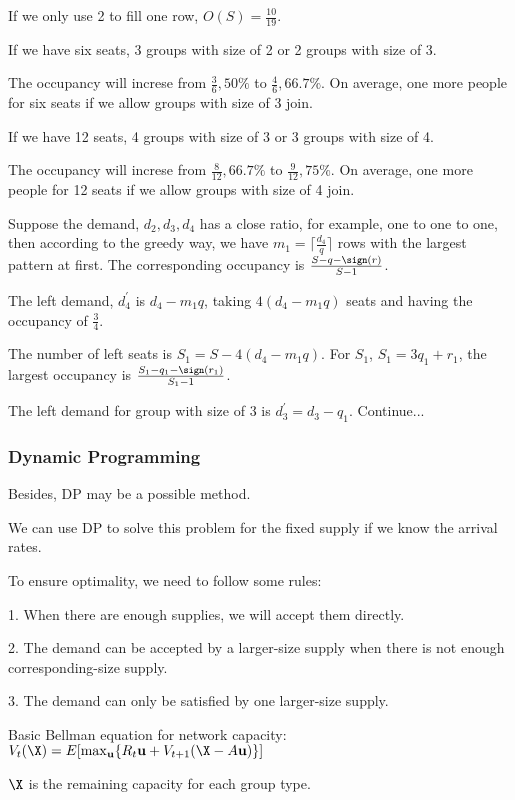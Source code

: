 If we only use 2 to fill one row, $O(S) = \frac{10}{19}$.

If we have six seats, 3 groups with size of 2 or 2 groups with size of 3.

The occupancy will increse from $\frac{3}{6}, 50\%$ to $\frac{4}{6}, 66.7\%$. On average, one more people for six seats if we allow groups with size of 3 join.

If we have 12 seats, 4 groups with size of 3 or 3 groups with size of 4.

The occupancy will increse from $\frac{8}{12}, 66.7\%$ to $\frac{9}{12}, 75\%$. On average, one more people for 12 seats if we allow groups with size of 4 join.

Suppose the demand, $d_2,d_3,d_4$ has a close ratio, for example, one to one to one, then according to the greedy way, we have $m_1 = \lceil \frac{d_4}{q} \rceil$ rows with the largest pattern at first. The corresponding occupancy is $\frac{S- q- \sign(r)}{S-1}$.

The left demand, $d^{'}_4$ is $d_4 - m_1 q$, taking $4(d_4 - m_1 q)$ seats and having the occupancy of $\frac{3}{4}$.

The number of left seats is $S_1 = S- 4(d_4 - m_1 q)$. For $S_1$, $S_1 = 3q_1 + r_1$, the largest occupancy is $\frac{S_1 - q_1 -\sign(r_1)}{S_1-1}$.

The left demand for group with size of 3 is $d^{'}_3= d_3 - q_1$. Continue...

\subsubsection{Dynamic Programming}
Besides, DP may be a possible method.

We can use DP to solve this problem for the fixed supply if we know the arrival rates.

To ensure optimality, we need to follow some rules:

1. When there are enough supplies, we will accept them directly.

2. The demand can be accepted by a larger-size supply when there is not enough corresponding-size supply. 

3. The demand can only be satisfied by one larger-size supply.

Basic Bellman equation for network capacity: $V_{t}(\X) = E[\max_{\mathbf{u}}\{R_{t}\mathbf{u}+ V_{t+1}(\X- A\mathbf{u})\}]$

$\X$ is the remaining capacity for each group type.

